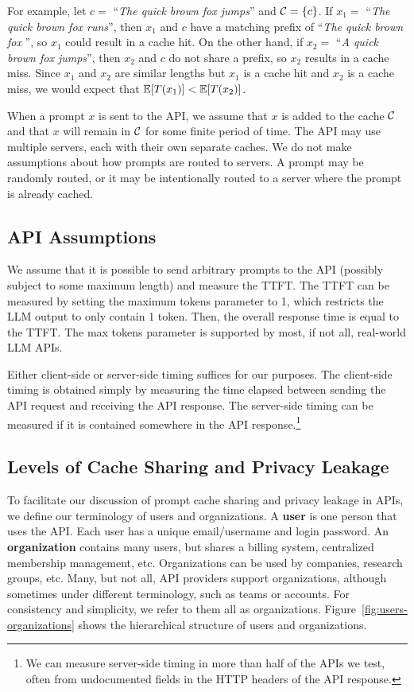 For example, let $c =$ ``\textit{The quick brown fox jumps}'' and $\mathcal{C} = \{c\}$. If $x_1 =$ ``\textit{The quick brown fox runs}'', then $x_1$ and $c$ have a matching prefix of ``\textit{The quick brown fox }'', so $x_1$ could result in a cache hit. On the other hand, if $x_2 =$ ``\textit{A quick brown fox jumps}'', then $x_2$ and $c$ do not share a prefix, so $x_2$ results in a cache miss. Since $x_1$ and $x_2$ are similar lengths but $x_1$ is a cache hit and $x_2$ is a cache miss, we would expect that $\mathbb{E}[T(x_1)] < \mathbb{E}[T(x_2)]$.

When a prompt $x$ is sent to the API, we assume that $x$ is added to the cache $\mathcal{C}$ and that $x$ will remain in $\mathcal{C}$ for some finite period of time. The API may use multiple servers, each with their own separate caches. We do not make assumptions about how prompts are routed to servers. A prompt may be randomly routed, or it may be intentionally routed to a server where the prompt is already cached.




\subsection{API Assumptions}

We assume that it is possible to send arbitrary prompts to the API (possibly subject to some maximum length) and measure the TTFT. The TTFT can be measured by setting the maximum tokens parameter to 1, which restricts the LLM output to only contain 1 token. Then, the overall response time is equal to the TTFT. The max tokens parameter is supported by most, if not all, real-world LLM APIs.

Either client-side or server-side timing suffices for our purposes. The client-side timing is obtained simply by measuring the time elapsed between sending the API request and receiving the API response. The server-side timing can be measured if it is contained somewhere in the API response.\footnote{We can measure server-side timing in more than half of the APIs we test, often from undocumented fields in the HTTP headers of the API response.}


\subsection{Levels of Cache Sharing and Privacy Leakage}



To facilitate our discussion of prompt cache sharing and privacy leakage in APIs, we define our terminology of users and organizations. A \textbf{user} is one person that uses the API. Each user has a unique email/username and login password. An \textbf{organization} contains many users, but shares a billing system, centralized membership management, etc. Organizations can be used by companies, research groups, etc. Many, but not all, API providers support organizations, although sometimes under different terminology, such as teams or accounts. For consistency and simplicity, we refer to them all as organizations. Figure~\ref{fig:users-organizations} shows the hierarchical structure of users and organizations.

